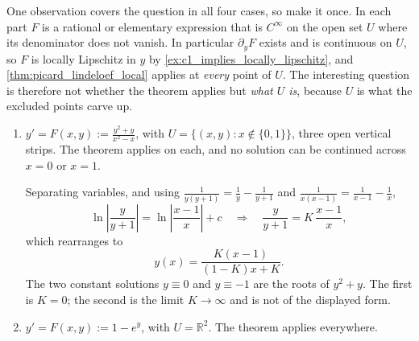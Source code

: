 \begin{exercisesolution}
One observation covers the  question in all four cases, so make it once.
In each part $F$ is a rational or elementary expression that is $C^\infty$ on the open set $U$
where its denominator does not vanish. In particular $\partial_yF$ exists and is continuous on
$U$, so $F$ is locally Lipschitz in $y$ by \cref{ex:c1_implies_locally_lipschitz}, and
\cref{thm:picard_lindeloef_local} applies at \emph{every} point of $U$. The interesting question is
therefore not whether the theorem applies but \emph{what $U$ is}, because $U$ is what the excluded
points carve up.

\begin{enumerate}[label=\textbf{(\alph*)}]
  \item $\displaystyle y' = F(x,y) := \frac{y^2+y}{x^2-x}$, with
    $U = \{(x,y) : x \notin\{0,1\}\}$, three open vertical strips. The theorem applies on each, and
    no solution can be continued across $x=0$ or $x=1$.

    Separating variables, and using
    $\frac{1}{y(y+1)} = \frac1y - \frac1{y+1}$ and $\frac{1}{x(x-1)} = \frac{1}{x-1} - \frac1x$,
    \[\ln\left\lvert\frac{y}{y+1}\right\rvert = \ln\left\lvert\frac{x-1}{x}\right\rvert + c
      \quad\Longrightarrow\quad \frac{y}{y+1} = K\,\frac{x-1}{x},\]
    which rearranges to
    \[y(x) = \frac{K(x-1)}{(1-K)x + K}.\]
    The two constant solutions $y \equiv 0$ and $y \equiv -1$ are the roots of $y^2+y$. The first
    is $K=0$; the second is the limit $K \to \infty$ and is not of the displayed form.

  \item $y' = F(x,y) := 1 - e^y$, with $U = \mathbb{R}^2$. The theorem applies everywhere.


\end{enumerate}
\end{exercisesolution}
